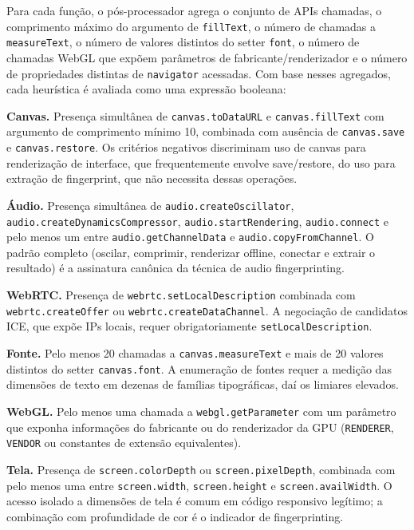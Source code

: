 Para cada função, o pós-processador agrega o conjunto de APIs chamadas, o
comprimento máximo do argumento de \texttt{fillText}, o número de chamadas a
\texttt{measureText}, o número de valores distintos do setter \texttt{font}, o
número de chamadas WebGL que expõem parâmetros de fabricante/renderizador e o
número de propriedades distintas de \texttt{navigator} acessadas. Com base
nesses agregados, cada heurística é avaliada como uma expressão booleana:

\textbf{Canvas.} Presença simultânea de \texttt{canvas.toDataURL} e
\texttt{canvas.fillText} com argumento de comprimento mínimo 10, combinada com
ausência de \texttt{canvas.save} e \texttt{canvas.restore}. Os critérios negativos
discriminam uso de canvas para renderização de interface, que frequentemente envolve
save/restore, do uso para extração de fingerprint, que não necessita dessas
operações.

\textbf{Áudio.} Presença simultânea de \texttt{audio.\allowbreak createOscillator},
\texttt{audio.\allowbreak createDynamicsCompressor}, \texttt{audio.\allowbreak startRendering},
\texttt{audio.\allowbreak connect} e pelo menos um entre \texttt{audio.\allowbreak getChannelData} e
\texttt{audio.\allowbreak copyFromChannel}. O padrão completo (oscilar, comprimir, renderizar offline, conectar e extrair o resultado) é a assinatura canônica da técnica de audio fingerprinting.

\textbf{WebRTC.} Presença de \texttt{webrtc.setLocalDescription} combinada com
\texttt{webrtc.createOffer} ou \texttt{webrtc.createDataChannel}. A negociação de
candidatos ICE, que expõe IPs locais, requer obrigatoriamente
\texttt{setLocalDescription}.

\textbf{Fonte.} Pelo menos 20 chamadas a \texttt{canvas.measureText} e mais de 20
valores distintos do setter \texttt{canvas.font}. A enumeração de fontes requer a
medição das dimensões de texto em dezenas de famílias tipográficas, daí os
limiares elevados.

\textbf{WebGL.} Pelo menos uma chamada a \texttt{webgl.getParameter} com um
parâmetro que exponha informações do fabricante ou do renderizador da GPU
(\texttt{RENDERER}, \texttt{VENDOR} ou constantes de extensão equivalentes).

\textbf{Tela.} Presença de \texttt{screen.colorDepth} ou
\texttt{screen.pixelDepth}, combinada com pelo menos uma entre
\texttt{screen.width}, \texttt{screen.height} e \texttt{screen.availWidth}. O
acesso isolado a dimensões de tela é comum em código responsivo legítimo; a
combinação com profundidade de cor é o indicador de fingerprinting.


